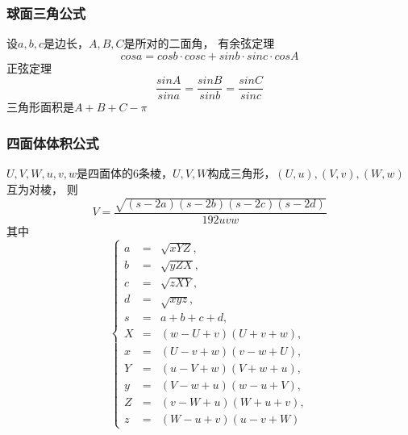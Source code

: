 \documentclass[a4paper]{article}
\begin{document}
\subsubsection{球面三角公式}

设$a, b, c$是边长，$A, B, C$是所对的二面角，
有余弦定理$$cos a = cos b \cdot cos c + sin b \cdot sin c \cdot cos A$$
正弦定理$$\frac{sin A}{sin a} = \frac{sin B}{sin b} = \frac{sin C}{sin c}$$
三角形面积是$A + B + C - \pi$

\subsubsection{四面体体积公式}

$U, V, W, u, v, w$是四面体的$6$条棱，$U, V, W$构成三角形，$(U, u), (V, v), (W, w)$互为对棱，
则$$V = \frac{\sqrt{(s - 2a)(s - 2b)(s - 2c)(s - 2d)}}{192 uvw}$$
其中$$\left\{\begin{array}{lll}
        a & = & \sqrt{xYZ}, \\
        b & = & \sqrt{yZX}, \\
        c & = & \sqrt{zXY}, \\
        d & = & \sqrt{xyz}, \\
        s & = & a + b + c + d, \\ 
        X & = & (w - U + v)(U + v + w), \\
        x & = & (U - v + w)(v - w + U), \\
        Y & = & (u - V + w)(V + w + u), \\
        y & = & (V - w + u)(w - u + V), \\
        Z & = & (v - W + u)(W + u + v), \\
        z & = & (W - u + v)(u - v + W)
    \end{array}\right.$$


\end{document}
